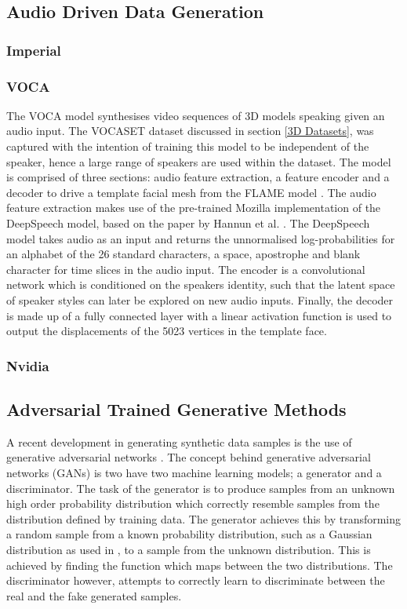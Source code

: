 \documentclass[12pt]{article}
\begin{document}
\subsection{Audio Driven Data Generation}

\subsubsection{Imperial}
\cite{Tzirakis2019}

\subsubsection{VOCA}
The VOCA model \cite{Cudeiro2019} synthesises video sequences of 3D models speaking given an audio input.
The VOCASET dataset discussed in section \ref{3D Datasets}, was captured with the intention of training this model to be independent of the speaker, hence a large range of speakers are used within the dataset.
The model is comprised of three sections: audio feature extraction, a feature encoder and a decoder to drive a template facial mesh from the FLAME model \cite{Li2017}.
The audio feature extraction makes use of the pre-trained Mozilla implementation of the DeepSpeech model, based on the paper by Hannun et al. \cite{Hannun2014}.
The DeepSpeech model takes audio as an input and returns the unnormalised log-probabilities for an alphabet of the 26 standard characters, a space, apostrophe and blank character for time slices in the audio input.
The encoder is a convolutional network which is conditioned on the speakers identity, such that the latent space of speaker styles can later be explored on new audio inputs.
Finally, the decoder is made up of a fully connected layer with a linear activation function is used to output the displacements of the 5023 vertices in the template face.

\subsubsection{Nvidia}
\cite{Karras2017a}


\subsection{Adversarial Trained Generative Methods}
A recent development in generating synthetic data samples is the use of generative adversarial networks \cite{Goodfellow2014}.
The concept behind generative adversarial networks (GANs) is two have two machine learning models; a generator and a discriminator.
The task of the generator is to produce samples from an unknown high order probability distribution which correctly resemble samples from the distribution defined by training data.
The generator achieves this by transforming a random sample from a known probability distribution, such as a Gaussian distribution as used in \cite{Goodfellow2014}, to a sample from the unknown distribution.
This is achieved by finding the function which maps between the two distributions.
The discriminator however, attempts to correctly learn to discriminate between the real and the fake generated samples.
\end{document}
